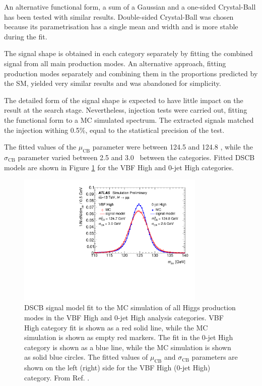 An alternative functional form, a sum of
a Gaussian and a one-sided Crystal-Ball has been tested with similar
results. Double-sided Crystal-Ball was chosen because its
parametrisation has a single mean and width and is more stable
during the fit.

The signal shape is obtained in each category separately by fitting
the combined signal from all main production modes. An alternative
approach, fitting production modes separately and combining them
in the proportions predicted by the SM, yielded very similar results
and was abandoned for simplicity.

The detailed form of the signal shape is expected to have little
impact on the result at the search stage. Nevertheless, injection
tests were carried out, fitting the functional form to a MC simulated
spectrum. The extracted signals matched the injection withing 0.5\%,
equal to the statistical precision of the test.

The fitted values of the $\mu_\text{CB}$ parameter were between
124.5 and 124.8 \GeV, while the $\sigma_\text{CB}$ parameter varied
between 2.5 and 3.0 \GeV~between the categories. Fitted DSCB models
are shown in Figure \ref{fig:hmumu:sig-model} for the VBF High and
0-jet High categories.
\begin{figure}[h!]
  \centering
  \includegraphics[width=0.8\textwidth]{figures/hmumu/sig-model}
  \caption[$\hmumu$ signal model]{
  DSCB signal model fit to the MC simulation of all Higgs production
  modes in the VBF High and 0-jet High analysis categories. VBF High
  category fit is shown as a red solid line, while the MC simulation
  is shown as empty red markers. The fit in the 0-jet High category
  is shown as a blue line, while the MC simulation is shown as solid 
  blue circles. The fitted values of $\mu_\text{CB}$ and
  $\sigma_\text{CB}$ parameters are shown on the left (right) side 
  for the VBF High (0-jet High) category. From Ref. \cite{ATLAS-CONF-2019-028}.
  }
  \label{fig:hmumu:sig-model}
\end{figure}

